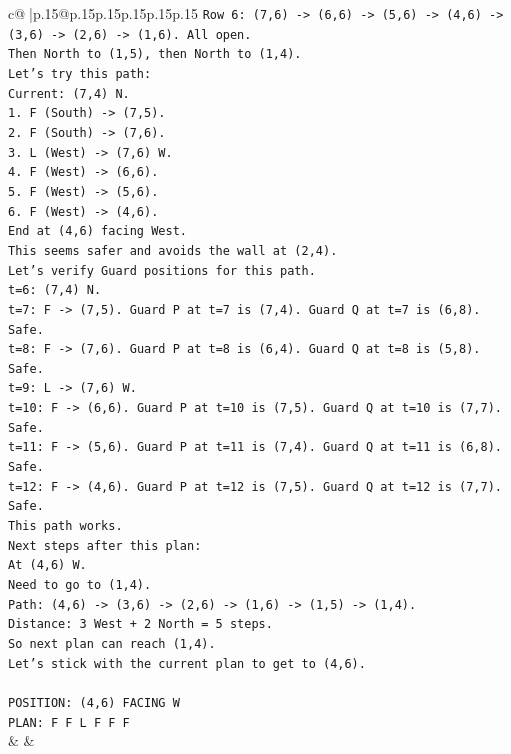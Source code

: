 \documentclass{article}
\begin{document}
{\begin{supertabular}{c@{$\;$}|p{.15\linewidth}@{}p{.15\linewidth}p{.15\linewidth}p{.15\linewidth}p{.15\linewidth}p{.15\linewidth}}
{{{\texttt{Row 6: (7,6) {-}> (6,6) {-}> (5,6) {-}> (4,6) {-}> (3,6) {-}> (2,6) {-}> (1,6). All open.} \\
\texttt{Then North to (1,5), then North to (1,4).} \\
\texttt{Let's try this path:} \\
\texttt{Current: (7,4) N.} \\
\texttt{1. F (South) {-}> (7,5).} \\
\texttt{2. F (South) {-}> (7,6).} \\
\texttt{3. L (West) {-}> (7,6) W.} \\
\texttt{4. F (West) {-}> (6,6).} \\
\texttt{5. F (West) {-}> (5,6).} \\
\texttt{6. F (West) {-}> (4,6).} \\
\texttt{End at (4,6) facing West.} \\
\texttt{This seems safer and avoids the wall at (2,4).} \\
\texttt{Let's verify Guard positions for this path.} \\
\texttt{t=6: (7,4) N.} \\
\texttt{t=7: F {-}> (7,5). Guard P at t=7 is (7,4). Guard Q at t=7 is (6,8). Safe.} \\
\texttt{t=8: F {-}> (7,6). Guard P at t=8 is (6,4). Guard Q at t=8 is (5,8). Safe.} \\
\texttt{t=9: L {-}> (7,6) W.} \\
\texttt{t=10: F {-}> (6,6). Guard P at t=10 is (7,5). Guard Q at t=10 is (7,7). Safe.} \\
\texttt{t=11: F {-}> (5,6). Guard P at t=11 is (7,4). Guard Q at t=11 is (6,8). Safe.} \\
\texttt{t=12: F {-}> (4,6). Guard P at t=12 is (7,5). Guard Q at t=12 is (7,7). Safe.} \\
\texttt{This path works.} \\
\texttt{Next steps after this plan:} \\
\texttt{At (4,6) W.} \\
\texttt{Need to go to (1,4).} \\
\texttt{Path: (4,6) {-}> (3,6) {-}> (2,6) {-}> (1,6) {-}> (1,5) {-}> (1,4).} \\
\texttt{Distance: 3 West + 2 North = 5 steps.} \\
\texttt{So next plan can reach (1,4).} \\
\texttt{Let's stick with the current plan to get to (4,6).} \\
\\ 
\texttt{POSITION: (4,6) FACING W} \\
\texttt{PLAN: F F L F F F} \\
            }
        }
    }
    & & \\ \\


\end{supertabular}}
\end{document}
